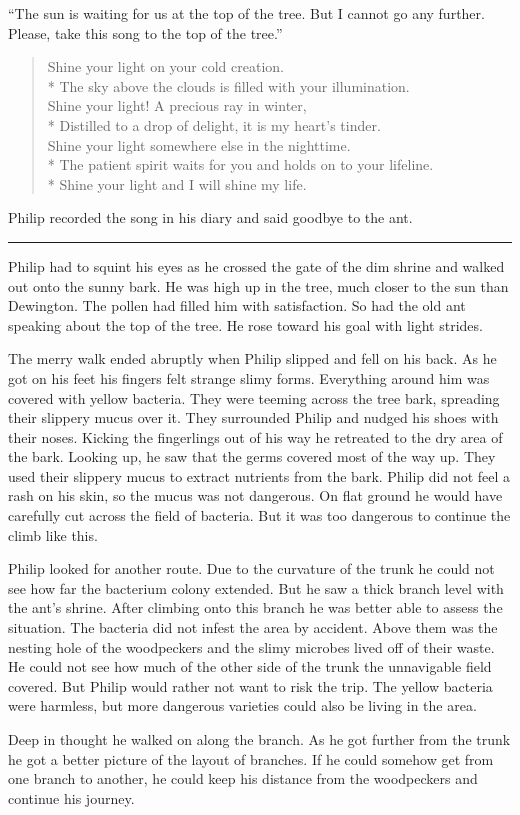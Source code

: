 \documentclass[10pt, draft]{memoir}
\renewcommand{\pfbreakdisplay}{\bigskip \ding{166} \bigskip}
\newcommand{\secbreak}{\fancybreak{\pfbreakdisplay}}
\newcommand{\sunsong}{
  Shine your light on your cold creation. \\*
  The sky above the clouds is filled with your illumination. \\
  Shine your light! A precious ray in winter, \\*
  Distilled to a drop of delight, it is my heart's tinder. \\
  Shine your light somewhere else in the nighttime. \\*
  The patient spirit waits for you and holds on to your lifeline. \\*
  Shine your light and I will shine my life.
}
\begin{document}
``The sun is waiting for us at the top of the tree. But I cannot go any
further. Please, take this song to the top of the tree.''


\begin{verse}
\sunsong
\end{verse}


Philip recorded the song in his diary and said goodbye to the ant.

\secbreak

Philip had to squint his eyes as he crossed the gate of the dim shrine and
walked out onto the sunny bark. He was high up in the tree, much closer to the
sun than Dewington. The pollen had filled him with satisfaction. So had the old
ant speaking about the top of the tree. He rose toward his goal with light
strides.

The merry walk ended abruptly when Philip slipped and fell on his back. As he
got on his feet his fingers felt strange slimy forms. Everything around him was
covered with yellow bacteria. They were teeming across the tree bark, spreading
their slippery mucus over it. They surrounded Philip and nudged his shoes with
their noses. Kicking the fingerlings out of his way he retreated to the dry
area of the bark. Looking up, he saw that the germs covered most of the way up.
They used their slippery mucus to extract nutrients from the bark. Philip did
not feel a rash on his skin, so the mucus was not dangerous. On flat ground he
would have carefully cut across the field of bacteria. But it was too dangerous
to continue the climb like this.

Philip looked for another route. Due to the curvature of the trunk he could not
see how far the bacterium colony extended. But he saw a thick branch level with
the ant's shrine. After climbing onto this branch he was better able to assess
the situation. The bacteria did not infest the area by accident. Above them was
the nesting hole of the woodpeckers and the slimy microbes lived off of their
waste. He could not see how much of the other side of the trunk the unnavigable
field covered. But Philip would rather not want to risk the trip. The yellow
bacteria were harmless, but more dangerous varieties could also be living in
the area.

Deep in thought he walked on along the branch. As he got further from the trunk
he got a better picture of the layout of branches. If he could somehow get from
one branch to another, he could keep his distance from the woodpeckers and
continue his journey.
\end{document}
